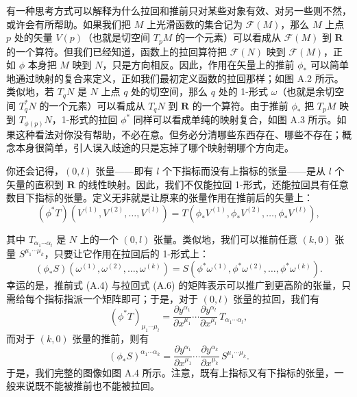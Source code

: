 有一种思考方式可以解释为什么拉回和推前只对某些对象有效、对另一些则不然，或许会有所帮助。如果我们把 $M$ 上光滑函数的集合记为 $\mathcal{F}(M)$，那么 $M$ 上点 $p$ 处的矢量 $V(p)$（也就是切空间 $T_{p}M$ 的一个元素）可以看成从 $\mathcal{F}(M)$ 到 $\mathbf{R}$ 的一个算符。但我们已经知道，函数上的拉回算符把 $\mathcal{F}(N)$ 映到 $\mathcal{F}(M)$，正如 $\phi$ 本身把 $M$ 映到 $N$，只是方向相反。因此，作用在矢量上的推前 $\phi_{*}$ 可以简单地通过映射的复合来定义，正如我们最初定义函数的拉回那样；如图 A.2 所示。类似地，若 $T_{q}N$ 是 $N$ 上点 $q$ 处的切空间，那么 $q$ 处的 1-形式 $\omega$（也就是余切空间 $T_{q}^{*}N$ 的一个元素）可以看成从 $T_{q}N$ 到 $\mathbf{R}$ 的一个算符。由于推前 $\phi_{*}$ 把 $T_{p}M$ 映到 $T_{\phi(p)}N$，1-形式的拉回 $\phi^{*}$ 同样可以看成单纯的映射复合，如图 A.3 所示。如果这种看法对你没有帮助，不必在意。但务必分清哪些东西存在、哪些不存在；概念本身很简单，引人误入歧途的只是忘掉了哪个映射朝哪个方向走。

你还会记得，$(0,l)$ 张量——即有 $l$ 个下指标而没有上指标的张量——是从 $l$ 个矢量的直积到 $\mathbf{R}$ 的线性映射。因此，我们不仅能拉回 1-形式，还能拉回具有任意数目下指标的张量。定义无非就是让原来的张量作用在推前后的矢量上：
\begin{equation*}
(\phi^{*}T)(V^{(1)},V^{(2)},\ldots,V^{(l)}) = T(\phi_{*}V^{(1)},\phi_{*}V^{(2)},\ldots,\phi_{*}V^{(l)}),
\tag{A.7}
\end{equation*}



其中 $T_{\alpha_{1}\cdots\alpha_{l}}$ 是 $N$ 上的一个 $(0,l)$ 张量。类似地，我们可以推前任意 $(k,0)$ 张量 $S^{\mu_{1}\cdots\mu_{k}}$，只要让它作用在拉回后的 1-形式上：
\begin{equation*}
(\phi_{*}S)(\omega^{(1)},\omega^{(2)},\ldots,\omega^{(k)}) = S(\phi^{*}\omega^{(1)},\phi^{*}\omega^{(2)},\ldots,\phi^{*}\omega^{(k)}).
\tag{A.8}
\end{equation*}
幸运的是，推前式 (A.4) 与拉回式 (A.6) 的矩阵表示可以推广到更高阶的张量，只需给每个指标指派一个矩阵即可；于是，对于 $(0,l)$ 张量的拉回，我们有
\begin{equation*}
\boxed{\,(\phi^{*}T)_{\mu_{1}\cdots\mu_{l}} = \frac{\partial y^{\alpha_{1}}}{\partial x^{\mu_{1}}}\cdots\frac{\partial y^{\alpha_{l}}}{\partial x^{\mu_{l}}}\,T_{\alpha_{1}\cdots\alpha_{l}},\,}
\tag{A.9}
\end{equation*}
而对于 $(k,0)$ 张量的推前，则有
\begin{equation*}
\boxed{\,(\phi_{*}S)^{\alpha_{1}\cdots\alpha_{k}} = \frac{\partial y^{\alpha_{1}}}{\partial x^{\mu_{1}}}\cdots\frac{\partial y^{\alpha_{k}}}{\partial x^{\mu_{k}}}\,S^{\mu_{1}\cdots\mu_{k}}.\,}
\tag{A.10}
\end{equation*}
于是，我们完整的图像如图 A.4 所示。注意，既有上指标又有下指标的张量，一般来说既不能被推前也不能被拉回。

